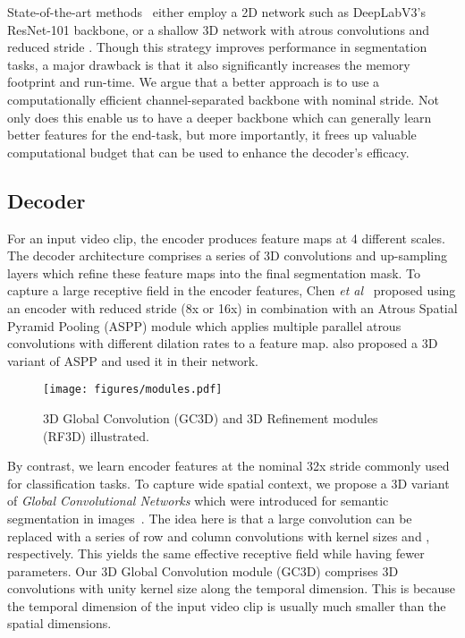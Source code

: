 \documentclass{bmvc2k}
\makeatletter
\newcommand*{\etal}{\emph{et al.}\@\xspace}
\def\etal{\emph{et al}\bmvaOneDot}
\makeatother
\begin{document}
State-of-the-art methods~\cite{Yang19ICCVAnchorDiff,Wang19ICCV} either employ a 2D network such as DeepLabV3's~\cite{Chen17ARXIV} ResNet-101 backbone, or a shallow 3D network with atrous convolutions and reduced stride \cite{Hou19BMVC}. Though this strategy improves performance in segmentation tasks, a major drawback is that it also significantly increases the memory footprint and run-time. We argue that a better approach is to use a computationally efficient channel-separated backbone with nominal stride. Not only does this enable us to have a deeper backbone which can generally learn better features for the end-task, but more importantly, it frees up valuable computational budget that can be used to enhance the decoder's efficacy.



\subsection{Decoder}
\label{sec:decoder}

For an input video clip, the encoder produces feature maps at 4 different scales. The decoder architecture comprises a series of 3D convolutions and up-sampling layers which refine these feature maps into the final segmentation mask. 
To capture a large receptive field in the encoder features, Chen \etal~\cite{Chen2018ECCV} proposed using an encoder with reduced stride (8x or 16x) in combination with an Atrous Spatial Pyramid Pooling (ASPP) module which applies multiple parallel atrous convolutions with different dilation rates to a feature map. \cite{Hou19BMVC} also proposed a 3D variant of ASPP and used it in their network. 

\begin{wrapfigure}[18]{r}{0.5\textwidth}
\centering
    \texttt{[image: figures/modules.pdf]}
    \caption{3D Global Convolution (GC3D) and 3D Refinement modules (RF3D) illustrated.}
    \label{fig:modules}
\vspace{-3mm}
\end{wrapfigure}
By contrast, we learn encoder features at the nominal 32x stride commonly used for classification tasks.
To capture wide spatial context, we propose a 3D variant of \textit{Global Convolutional Networks} which were introduced for semantic segmentation in images~\cite{Peng17CVPR}.
The idea here is that a large  convolution can be replaced with a series of row and column convolutions with kernel sizes  and , respectively. This yields the same effective receptive field while having fewer parameters. 
Our 3D Global Convolution module (GC3D) comprises 3D convolutions with unity kernel size along the temporal dimension. This is because the temporal dimension of the input video clip is usually much smaller than the spatial dimensions.
\end{document}
